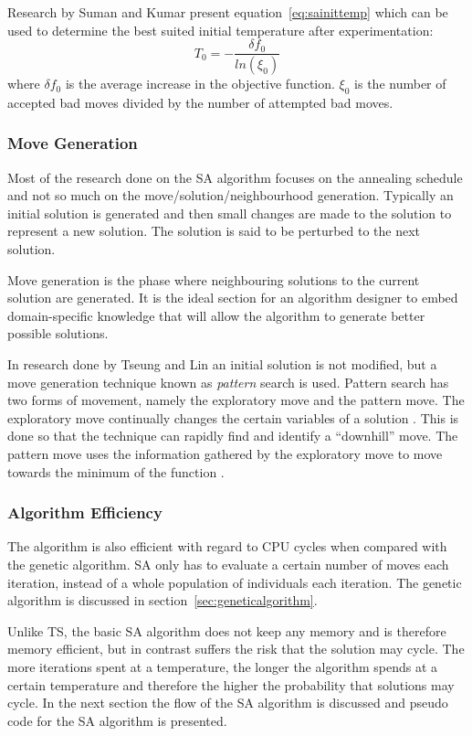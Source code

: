 Research by Suman and Kumar\cite{SASingleMultiObj} present equation~\ref{eq:sainittemp} which can be used to determine the best suited initial temperature after experimentation:
\begin{equation}
    \label{eq:sainittemp}
    T_0=-\frac{\delta f_0}{ln(\xi_0)}
\end{equation}
where $\delta f_0$ is the average increase in the objective function. $\xi_0$ is the number of accepted bad moves divided by the number of attempted bad moves\cite{SASingleMultiObj}.

\subsubsection{Move Generation}
Most of the research done on the \gls{SA} algorithm focuses on the annealing schedule and not so much on the move/solution/neighbourhood generation. Typically an initial solution is generated and then small changes are made to the solution to represent a new solution. The solution is said to be perturbed to the next solution.

Move generation is the phase where neighbouring solutions to the current solution are generated. It is the ideal section for an algorithm designer to embed domain-specific knowledge that will allow the algorithm to generate better possible solutions.

In research done by Tseung and Lin \cite{CurveFittingSA} an initial solution is not modified, but a move generation technique known as \emph{pattern} search is used. Pattern search has two forms of movement, namely the exploratory move and the pattern move. The exploratory move continually changes the certain variables of a solution \cite{CurveFittingSA}. This is done so that the technique can rapidly find and identify a ``downhill'' move. The pattern move uses the information gathered by the exploratory move to move towards the minimum of the function \cite{CurveFittingSA}.
\subsubsection{Algorithm Efficiency}
The algorithm is also efficient with regard to CPU cycles when compared with the genetic algorithm. \gls{SA} only has to evaluate a certain number of moves each iteration, instead of a whole population of individuals each iteration. The genetic algorithm is discussed in section~\ref{sec:geneticalgorithm}.

Unlike \gls{TS}, the basic \gls{SA} algorithm does not keep any memory and is therefore memory efficient, but in contrast suffers the risk that the solution may cycle. The more iterations spent at a temperature, the longer the algorithm spends at a certain temperature and therefore the higher the probability that solutions may cycle. In the next section the flow of the \gls{SA} algorithm is discussed and pseudo code for the \gls{SA} algorithm is presented.

